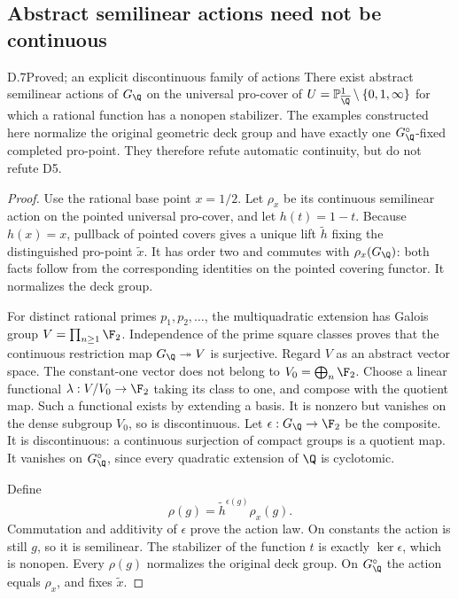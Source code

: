 \subsection{Abstract semilinear actions need not be continuous}

\begin{claim}{D.7}{Proved; an explicit discontinuous family of actions}
There exist abstract semilinear actions of $G_\Q$ on the universal
pro-cover of $U=\mathbb P^1_{\overline\Q}\setminus\{0,1,\infty\}$
for which a rational function has a nonopen stabilizer. The examples
constructed here normalize the original geometric deck group and
have exactly one $G_\Q^\circ$-fixed completed pro-point. They
therefore refute automatic continuity, but do not refute D5.
\end{claim}
\begin{proof}
Use the rational base point $x=1/2$. Let $\rho_x$ be its continuous
semilinear action on the pointed universal pro-cover, and let
$h(t)=1-t$. Because $h(x)=x$, pullback of pointed covers gives a
unique lift $\widetilde h$ fixing the distinguished pro-point
$\widetilde x$. It has order two and commutes with $\rho_x(G_\Q)$:
both facts follow from the corresponding identities on the
pointed covering functor. It normalizes the deck group.

For distinct rational primes $p_1,p_2,\ldots$, the multiquadratic
extension has Galois group $V=\prod_{n\geq1}\F_2$. Independence
of the prime square classes proves that the continuous restriction
map $G_\Q\twoheadrightarrow V$ is surjective. Regard $V$ as an
abstract vector space. The constant-one vector does not belong to
$V_0=\bigoplus_n\F_2$. Choose a linear functional
$\lambda:V/V_0\to\F_2$ taking its class to one, and compose
with the quotient map. Such a functional exists by extending a
basis. It is nonzero but vanishes on the dense subgroup $V_0$,
so is discontinuous. Let $\epsilon:G_\Q\to\F_2$ be the composite.
It is discontinuous: a continuous surjection of compact groups is
a quotient map. It vanishes on $G_\Q^\circ$, since every quadratic
extension of $\Q$ is cyclotomic.

Define
\[
       \rho(g)=\widetilde h^{\epsilon(g)}\rho_x(g).
\]
Commutation and additivity of $\epsilon$ prove the action law.
On constants the action is still $g$, so it is semilinear.
The stabilizer of the function $t$ is exactly $\ker\epsilon$,
which is nonopen. Every $\rho(g)$ normalizes the original deck
group. On $G_\Q^\circ$ the action equals $\rho_x$, and fixes
$\widetilde x$.


\end{proof}
